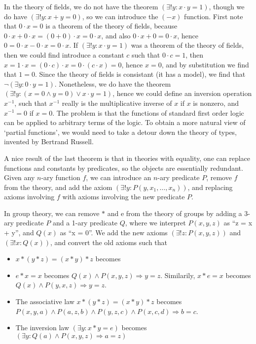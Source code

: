 \begin{example}
    In the theory of fields, we do not have the theorem $(\exists ! y : x \cdot y = 1)$, though we do have $(\exists ! y : x + y = 0)$, so we can introduce the $(-x)$ function. First note that $0 \cdot x = 0$ is a theorem of the theory of fields, because $0 \cdot x + 0 \cdot x = (0 + 0) \cdot x = 0 \cdot x$, and also $0 \cdot x + 0 = 0 \cdot x$, hence $0 = 0 \cdot x - 0 \cdot x = 0 \cdot x$. If $(\exists ! y : x \cdot y = 1)$ was a theorem of the theory of fields, then we could find introduce a constant $c$ such that $0 \cdot c = 1$, then $x = 1 \cdot x = (0 \cdot c) \cdot x = 0 \cdot (c \cdot x) = 0$, hence $x = 0$, and by substitution we find that $1 = 0$. Since the theory of fields is consistant (it has a model), we find that $\neg (\exists y: 0 \cdot y = 1)$. Nonetheless, we do have the theorem $(\exists ! y: (x = 0 \wedge y = 0) \vee x \cdot y = 1)$, hence we could define an inversion operation $x^{-1}$, such that $x^{-1}$ really is the multiplicative inverse of $x$ if $x$ is nonzero, and $x^{-1} = 0$ if $x = 0$. The problem is that the functions of standard first order logic can be applied to arbitrary terms of the logic. To obtain a more natural view of `partial functions', we would need to take a detour down the theory of types, invented by Bertrand Russell.
\end{example}

A nice result of the last theorem is that in theories with equality, one can replace functions and constants by predicates, so the objects are essentially redundant. Given any $n$-ary function $f$, we can introduce an $n$-ary predicate $P$, remove $f$ from the theory, and add the axiom $(\exists ! y: P(y,x_1,\dots,x_n))$, and replacing axioms involving $f$ with axioms involving the new predicate $P$.

\begin{example}
    In group theory, we can remove $*$ and e from the theory of groups by adding a 3-ary predicate $P$ and a 1-ary predicate $Q$, where we interpret $P(x,y,z)$ as ``z = x + y'', and $Q(x)$ as ``x = 0''. We add the new axioms $(\exists ! z : P(x,y,z))$ and $(\exists ! x : Q(x))$, and convert the old axioms such that
    \begin{itemize}
        \item $x * (y * z) = (x * y) * z$ becomes
        \item $e * x = x$ becomes $Q(x) \wedge P(x,y,z) \Rightarrow y = z$. Similarily, $x * e = x$ becomes $Q(x) \wedge P(y,x,z) \Rightarrow y = z$.
        \item The associative law $x * (y * z) = (x * y) * z$ becomes $P(x,y,a) \wedge P(a,z,b) \wedge P(y,z,c) \wedge P(x,c,d) \Rightarrow b = c$.
        \item The inversion law $(\exists y: x * y = e)$ becomes $(\exists y: Q(a) \wedge P(x,y,z) \Rightarrow a = z)$
    \end{itemize}
\end{example}

